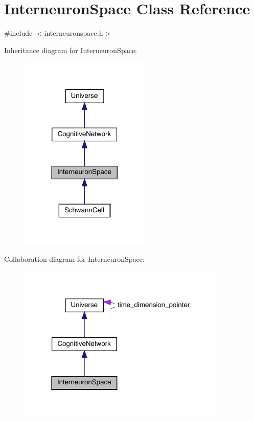 \hypertarget{class_interneuron_space}{}\section{Interneuron\+Space Class Reference}
\label{class_interneuron_space}


{\ttfamily \#include $<$interneuronspace.\+h$>$}



Inheritance diagram for Interneuron\+Space\+:\nopagebreak
\begin{figure}[H]
\begin{center}
\leavevmode
\includegraphics[width=176pt]{class_interneuron_space__inherit__graph}
\end{center}
\end{figure}


Collaboration diagram for Interneuron\+Space\+:
\nopagebreak
\begin{figure}[H]
\begin{center}
\leavevmode
\includegraphics[width=283pt]{class_interneuron_space__coll__graph}
\end{center}
\end{figure}
